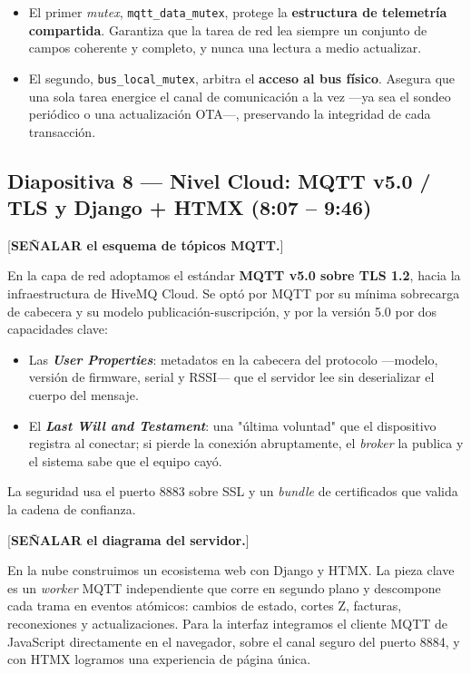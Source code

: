 \documentclass[11pt, a4paper]{article}
\begin{document}
\begin{itemize}[label=-]
    \item El primer \textit{mutex}, \texttt{mqtt\_data\_mutex}, protege la \textbf{estructura de telemetría compartida}. Garantiza que la tarea de red lea siempre un conjunto de campos coherente y completo, y nunca una lectura a medio actualizar.
    \item El segundo, \texttt{bus\_local\_mutex}, arbitra el \textbf{acceso al bus físico}. Asegura que una sola tarea energice el canal de comunicación a la vez —ya sea el sondeo periódico o una actualización OTA—, preservando la integridad de cada transacción.
\end{itemize}

\subsection*{Diapositiva 8 — Nivel Cloud: MQTT v5.0 / TLS y Django + HTMX (8:07 – 9:46)}

[\textbf{SEÑALAR el esquema de tópicos MQTT.}]

En la capa de red adoptamos el estándar \textbf{MQTT v5.0 sobre TLS 1.2}, hacia la infraestructura de HiveMQ Cloud. Se optó por MQTT por su mínima sobrecarga de cabecera y su modelo publicación-suscripción, y por la versión 5.0 por dos capacidades clave:

\begin{itemize}[label=-]
    \item Las \textbf{\textit{User Properties}}: metadatos en la cabecera del protocolo —modelo, versión de firmware, serial y RSSI— que el servidor lee sin deserializar el cuerpo del mensaje.
    \item El \textbf{\textit{Last Will and Testament}}: una "última voluntad" que el dispositivo registra al conectar; si pierde la conexión abruptamente, el \textit{broker} la publica y el sistema sabe que el equipo cayó.
\end{itemize}

La seguridad usa el puerto 8883 sobre SSL y un \textit{bundle} de certificados que valida la cadena de confianza.

[\textbf{SEÑALAR el diagrama del servidor.}]

En la nube construimos un ecosistema web con Django y HTMX. La pieza clave es un \textit{worker} MQTT independiente que corre en segundo plano y descompone cada trama en eventos atómicos: cambios de estado, cortes Z, facturas, reconexiones y actualizaciones. Para la interfaz integramos el cliente MQTT de JavaScript directamente en el navegador, sobre el canal seguro del puerto 8884, y con HTMX logramos una experiencia de página única.
\end{document}
